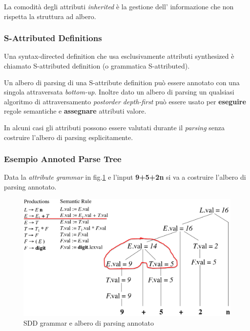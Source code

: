La comodit\`a degli attributi \textit{inherited} \`e la gestione dell'
informazione che non rispetta la struttura ad albero.

\subsubsection{S-Attributed Definitions}
\begin{definition}
Una syntax-directed definition che usa esclusivamente attributi synthesized \`e
chiamato S-attributed definition (o grammatica S-attributed).
\end{definition}

Un albero di parsing di una S-attribute definition pu\`o essere annotato con una
singola attraversata \textit{bottom-up}. Inoltre dato un albero di parsing un
qualsiasi algoritmo di attraversamento \textit{postorder depth-first} pu\`o
essere usato per \textbf{eseguire} regole semantiche e \textbf{assegnare}
attributi valore.

In alcuni casi gli attributi possono essere valutati durante il \textit{parsing}
senza costruire l'albero di parsing esplicitamente.

\subsubsection{Esempio Annoted Parse Tree}
Data la \textit{attribute grammar} in fig.\ref{img:sdd_example} e l'input
\textbf{9+5+2n} si va a costruire l'albero di parsing annotato.
\begin{figure}[H]
  \centering
  \includegraphics[scale=0.4]{res/image/sdd_example}
  \caption{SDD grammar e albero di parsing annotato}
  \label{img:sdd_example}
\end{figure}

